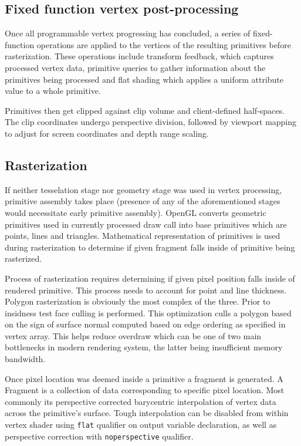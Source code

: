 \subsection{Fixed function vertex post-processing}

Once all programmable vertex progressing has concluded, a series of fixed-function operations are applied to the vertices of the resulting primitives before rasterization.
These operations include transform feedback, which captures processed vertex data, 
primitive queries to gather information about the primitives being processed 
and flat shading which applies a uniform attribute value to a whole primitive.

Primitives then get clipped against clip volume and client-defined half-spaces.
The clip coordinates undergo perspective division, followed by viewport mapping to adjust for screen coordinates and depth range scaling.

\subsection{Rasterization}

If neither tesselation stage nor geometry stage was used in vertex processing, primitive assembly takes place (presence of any of the aforementioned stages would necessitate early primitive assembly). 
OpenGL converts geometric primitives used in currently processed draw call into base primitives which are points, lines and triangles.
Mathematical representation of primitives is used during rasterization to determine if given fragment falls inside of primitive being rasterized.

Process of rasterization requires determining if given pixel position falls inside of rendered primitive. This process needs to account for point and line thickness.
Polygon rasterization is obviously the most complex of the three. Prior to insidness test face culling is performed. 
This optimization culls a polygon based on the sign of surface normal computed based on edge ordering as specified in vertex array.
This helps reduce overdraw which can be one of two main bottlenecks in modern rendering system, the latter being insufficient memory bandwidth.

Once pixel location was deemed inside a primitive a fragment is generated. 
A Fragment is a collection of data corresponding to specific pixel location.
Most commonly its perspective corrected barycentric interpolation of vertex data across the primitive's surface.
Tough interpolation can be disabled from within vertex shader using \texttt{flat} qualifier on output variable declaration,
as well as perspective correction with \texttt{noperspective} qualifier.

